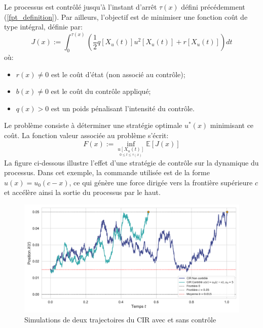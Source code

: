 Le processus est contrôlé jusqu'à l'instant d'arrêt $\tau(x)$ défini précédemment (\ref{fpt_definition}).
Par ailleurs, l'objectif est de minimiser une fonction coût de type intégral, définie par:
\begin{equation}\label{cost_function}
    J(x) := \int_0^{\tau(x)} \left( \frac{1}{2}q[X_u(t)]u^2[X_u(t)] + r[X_u(t)] \right) dt
\end{equation}
où:
\begin{itemize}
    \item \( r(x) \neq 0 \) est le coût d'état (non associé au contrôle);
    \item \( b(x) \neq 0 \) est le coût du contrôle appliqué;
    \item \( q(x) > 0 \) est un poids pénalisant l'intensité du contrôle.
\end{itemize}

Le problème consiste à déterminer une stratégie optimale \( u^*(x) \) minimisant ce coût. La fonction valeur associée au problème s'écrit:
\begin{equation}\label{value_function}
    F(x) := \inf_{\underset{0 \leq t \leq \tau(x)}{u[X_u(t)]}} \mathds{E}[J(x)]
\end{equation}
La figure ci-dessous illustre l'effet d'une stratégie de contrôle sur la dynamique du processus. Dans cet exemple, la commande utilisée est de la forme \( u(x) = u_0(c - x) \), ce qui génère une force dirigée vers la frontière supérieure \( c \) et accélère ainsi la sortie du processus par le haut.
\begin{figure}[htb]
    \centering
    \includegraphics[width=\linewidth]{img/intro/control.pdf}
    \caption{Simulations de deux trajectoires du CIR avec et sans contrôle}\label{fig:ControlViz}
\end{figure}
\FloatBarrier



\clearpage

